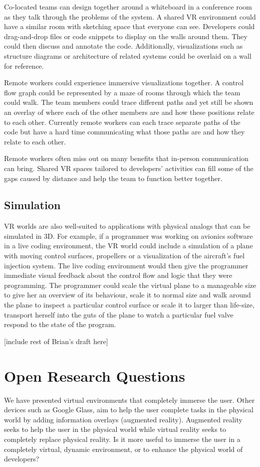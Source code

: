\documentclass{acm_proc_article-sp}
\begin{document}
Co-located teams can design together around a whiteboard in a conference room as they talk through the problems of the system. A shared VR environment could have a similar room with sketching space that everyone can see. Developers could drag-and-drop files or code snippets to display on the walls around them. They could then discuss and annotate the code. Additionally, visualizations such as structure diagrams or architecture of related systems could be overlaid on a wall for reference.

Remote workers could experience immersive visualizations together. A control flow graph could be represented by a maze of rooms through which the team could walk. The team members could trace different paths and yet still be shown an overlay of where each of the other members are and how these positions relate to each other. Currently remote workers can each trace separate paths of the code but have a hard time communicating what those paths are and how they relate to each other.

Remote workers often miss out on many benefits that in-person communication can bring. Shared VR spaces tailored to developers' activities can fill some of the gaps caused by distance and help the team to function better together. 

\subsection{Simulation}
VR worlds are also well-suited to applications with physical analogs that can be simulated in 3D. For example, if a programmer was working on avionics software in a live coding environment, the VR world could include a simulation of a plane with moving control surfaces, propellers or a visualization of the aircraft's fuel injection system. The live coding environment would then give the programmer immediate visual feedback about the control flow and logic that they were programming. The programmer could scale the virtual plane to a manageable size to give her an overview of its behaviour, scale it to normal size and walk around the plane to inspect a particular control surface or scale it to larger than life-size, transport herself into the guts of the plane to watch a particular fuel valve respond to the state of the program.

[include rest of Brian's draft here]

\section{Open Research Questions}
We have presented virtual environments that completely immerse the user. Other devices such as Google Glass, aim to help the user complete tasks in the physical world by adding information overlays (augmented reality). Augmented reality seeks to help the user in the physical world while virtual reality seeks to completely replace physical reality. 
Is it more useful to immerse the user in a completely virtual, dynamic environment, or to enhance the physical world of developers?
  
\end{document}
